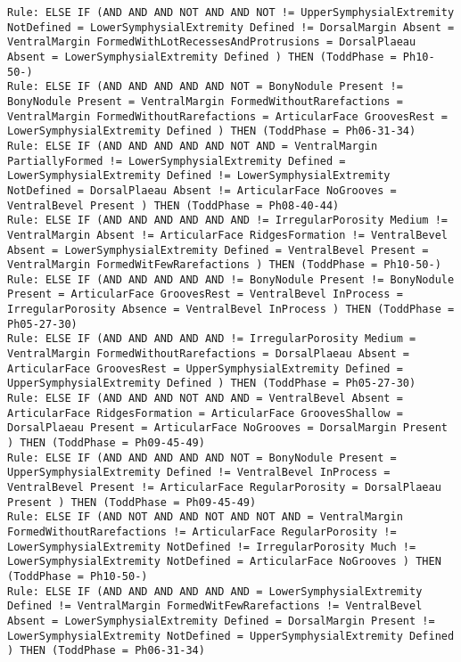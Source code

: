 \begin{lstlisting}
Rule: ELSE IF (AND AND AND NOT AND AND NOT != UpperSymphysialExtremity NotDefined = LowerSymphysialExtremity Defined != DorsalMargin Absent = VentralMargin FormedWithLotRecessesAndProtrusions = DorsalPlaeau Absent = LowerSymphysialExtremity Defined ) THEN (ToddPhase = Ph10-50-)
Rule: ELSE IF (AND AND AND AND AND NOT = BonyNodule Present != BonyNodule Present = VentralMargin FormedWithoutRarefactions = VentralMargin FormedWithoutRarefactions = ArticularFace GroovesRest = LowerSymphysialExtremity Defined ) THEN (ToddPhase = Ph06-31-34)
Rule: ELSE IF (AND AND AND AND AND NOT AND = VentralMargin PartiallyFormed != LowerSymphysialExtremity Defined = LowerSymphysialExtremity Defined != LowerSymphysialExtremity NotDefined = DorsalPlaeau Absent != ArticularFace NoGrooves = VentralBevel Present ) THEN (ToddPhase = Ph08-40-44)
Rule: ELSE IF (AND AND AND AND AND AND != IrregularPorosity Medium != VentralMargin Absent != ArticularFace RidgesFormation != VentralBevel Absent = LowerSymphysialExtremity Defined = VentralBevel Present = VentralMargin FormedWitFewRarefactions ) THEN (ToddPhase = Ph10-50-)
Rule: ELSE IF (AND AND AND AND AND != BonyNodule Present != BonyNodule Present = ArticularFace GroovesRest = VentralBevel InProcess = IrregularPorosity Absence = VentralBevel InProcess ) THEN (ToddPhase = Ph05-27-30)
Rule: ELSE IF (AND AND AND AND AND != IrregularPorosity Medium = VentralMargin FormedWithoutRarefactions = DorsalPlaeau Absent = ArticularFace GroovesRest = UpperSymphysialExtremity Defined = UpperSymphysialExtremity Defined ) THEN (ToddPhase = Ph05-27-30)
Rule: ELSE IF (AND AND AND NOT AND AND = VentralBevel Absent = ArticularFace RidgesFormation = ArticularFace GroovesShallow = DorsalPlaeau Present = ArticularFace NoGrooves = DorsalMargin Present ) THEN (ToddPhase = Ph09-45-49)
Rule: ELSE IF (AND AND AND AND AND NOT = BonyNodule Present = UpperSymphysialExtremity Defined != VentralBevel InProcess = VentralBevel Present != ArticularFace RegularPorosity = DorsalPlaeau Present ) THEN (ToddPhase = Ph09-45-49)
Rule: ELSE IF (AND NOT AND AND NOT AND NOT AND = VentralMargin FormedWithoutRarefactions != ArticularFace RegularPorosity != LowerSymphysialExtremity NotDefined != IrregularPorosity Much != LowerSymphysialExtremity NotDefined = ArticularFace NoGrooves ) THEN (ToddPhase = Ph10-50-)
Rule: ELSE IF (AND AND AND AND AND AND = LowerSymphysialExtremity Defined != VentralMargin FormedWitFewRarefactions != VentralBevel Absent = LowerSymphysialExtremity Defined = DorsalMargin Present != LowerSymphysialExtremity NotDefined = UpperSymphysialExtremity Defined ) THEN (ToddPhase = Ph06-31-34)

\end{lstlisting}
